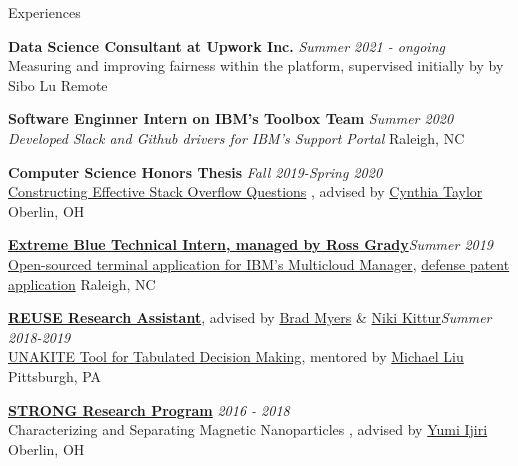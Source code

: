 \documentclass{resume}
\begin{document}
\begin{rSection}{Experiences}

{\bf Data Science Consultant at Upwork Inc.} \hfill  {\em Summer 2021 - ongoing} \\
{Measuring and improving fairness within the platform, supervised initially by by Sibo Lu} \hfill {Remote} 

{\bf Software Enginner Intern on IBM's Toolbox Team} \hfill  {\em Summer 2020} \\
{\it Developed Slack and Github drivers for IBM's Support Portal} \hfill { Raleigh, NC} 


{\bf Computer Science Honors Thesis}
\hfill  {\em Fall 2019-Spring 2020} \\
{\href{https://digitalcommons.oberlin.edu/cgi/viewcontent.cgi?article=1693&context=honors}{Constructing Effective Stack Overflow Questions} , advised by \href{https://cs.oberlin.edu/~ctaylor/}{Cynthia Taylor}} \hfill { Oberlin, OH}


\href{https://www.ibm.com/employment/extremeblue/index.html}{\bf Extreme Blue Technical Intern, managed by Ross Grady}\hfill  {\em Summer 2019} \\
\href{https://github.com/IBM/multicloud-incident-response-navigator}{Open-sourced terminal application for IBM's Multicloud Manager}, \href{https://priorart.ip.com/IPCOM/000262660}{defense patent application} \hfill { Raleigh, NC} 

 
\href{https://www.cmu.edu/scs/isr/reuse/}{\bf REUSE Research Assistant}, advised by \href{https://www.cs.cmu.edu/~bam/}{Brad Myers} \& \href{https://kittur.org/}{Niki Kittur}\hfill {\em Summer 2018-2019} \\
\href{https://unakite.info/}{UNAKITE Tool for Tabulated Decision Making}, mentored by \href{https://lxieyang.github.io/}{Michael Liu} \hfill { Pittsburgh, PA}

 {\bf \href{https://www.oberlin.edu/undergraduate-research/programs/strong}{STRONG Research Program}} \hfill {\em 2016 - 2018}\\
Characterizing and Separating Magnetic Nanoparticles , advised by \href{https://www.oberlin.edu/yumi-ijiri}{Yumi Ijiri} \hfill { Oberlin, OH}\\

\end{rSection}
\end{document}
